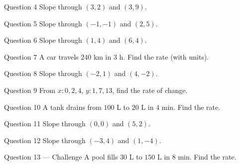 \documentclass[11pt]{article}
\begin{document}
\begin{qbox}{Question 4}
Slope through $(3,2)$ and $(3,9)$.\workspace{2.0cm}
\end{qbox}

\begin{qbox}{Question 5}
Slope through $(-1,-1)$ and $(2,5)$.\workspace{2.0cm}
\end{qbox}

\begin{qbox}{Question 6}
Slope through $(1,4)$ and $(6,4)$.\workspace{1.8cm}
\end{qbox}

\begin{qbox}{Question 7}
A car travels $240$ km in $3$ h. Find the rate (with units).\workspace{2.2cm}
\end{qbox}

\begin{qbox}{Question 8}
Slope through $(-2,1)$ and $(4,-2)$.\workspace{2.2cm}
\end{qbox}

\begin{qbox}{Question 9}
From $x:0,2,4$, $y:1,7,13$, find the rate of change.\workspace{2.0cm}
\end{qbox}

\begin{qbox}{Question 10}
A tank drains from $100$ L to $20$ L in $4$ min. Find the rate.\workspace{2.2cm}
\end{qbox}

\begin{qbox}{Question 11}
Slope through $(0,0)$ and $(5,2)$.\workspace{2.0cm}
\end{qbox}

\begin{qbox}{Question 12}
Slope through $(-3,4)$ and $(1,-4)$.\workspace{2.2cm}
\end{qbox}

\begin{qbox}{Question 13 --- Challenge}
A pool fills $30$ L to $150$ L in $8$ min. Find the rate.\workspace{2.4cm}
\end{qbox}

\clearpage
{}
\end{document}
